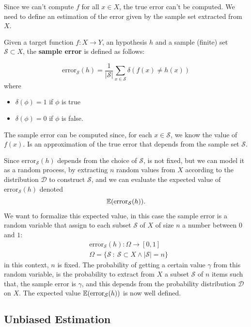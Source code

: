 \documentclass[10pt, letterpaper]{report}
\begin{document}
Since we can't compute $f$ for all $x\in X$, the true error can't be computed. We need to define an estimation of the error given by the sample set extracted from $X$.
\begin{definition}
	Given a target function $f:X\rightarrow Y$, an hypothesis $h$ and a sample (finite) set $\mathcal S\subset X$, the  \textbf{sample error} is defined as follows:
\end{definition}\begin{equation}
	\text{error}_{\mathcal S}(h)=
	\frac{1}{|\mathcal S|}\sum_{x\in\mathcal S}\delta(f(x)\ne h(x))
\end{equation}
where\begin{itemize}
	\item $\delta(\phi)=1$ if $\phi$ is true
	\item $\delta(\phi)=0$ if $\phi$ is false.
\end{itemize}
The sample error can be computed since, for each $x\in\mathcal S$, we know the value of $f(x)$. Is an approximation of the true error that depends from the sample set $\mathcal S$.\bigskip

Since $\text{error}_{\mathcal S}(h)$ depends from the choice of $\mathcal S$, is not fixed, but we can model it as a random process, by extracting $n$ random values from $X$ according to the distribution $\mathcal D$ to construct $\mathcal S$, and we can evaluate the expected value of $\text{error}_{\mathcal S}(h)$ denoted \begin{equation}
	{\mathbb E}(\text{error}_{\mathcal S}(h)).
\end{equation}
We want to formalize this expected value, in this case the sample error is a random variable that assign to each subset $\mathcal S$ of $X$ of size $n$ a number between 0 and $1$:
\begin{align}
	 & \text{error}_{\mathcal S}(h) : \Omega \rightarrow [0,1]                \\
	 & \Omega =\{\mathcal S \ : \ \mathcal S \subset X \land |\mathcal S|=n\}
\end{align}
in this context, $n$ is fixed. The probability of getting a certain value $\gamma$ from this random variable, is the probability to extract from $X$ a subset $\mathcal S$ of $n$ items such that, the sample error is $\gamma$, and this depends from the probability distribution $\mathcal D$ on $X$. The expected value ${\mathbb E}(\text{error}_{\mathcal S}(h))$ is now well defined.

\newpage
\subsection{Unbiased Estimation}
\end{document}
